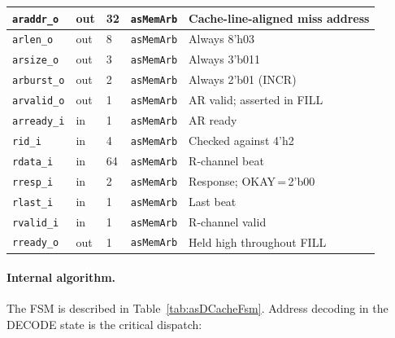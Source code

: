 \begin{table}[H]
\begin{tabularx}{\textwidth}{|l |l |l |l |X|}
  \hline
  \texttt{araddr\_o}  & out & 32 & \texttt{asMemArb} & Cache-line-aligned miss address \\
  \hline
  \texttt{arlen\_o}   & out & 8  & \texttt{asMemArb} & Always 8'h03 \\
  \hline
  \texttt{arsize\_o}  & out & 3  & \texttt{asMemArb} & Always 3'b011 \\
  \hline
  \texttt{arburst\_o} & out & 2  & \texttt{asMemArb} & Always 2'b01 (INCR) \\
  \hline
  \texttt{arvalid\_o} & out & 1  & \texttt{asMemArb} & AR valid; asserted in FILL \\
  \hline
  \texttt{arready\_i} & in  & 1  & \texttt{asMemArb} & AR ready \\
  \hline
  \texttt{rid\_i}     & in  & 4  & \texttt{asMemArb} & Checked against 4'h2 \\
  \hline
  \texttt{rdata\_i}   & in  & 64 & \texttt{asMemArb} & R-channel beat \\
  \hline
  \texttt{rresp\_i}   & in  & 2  & \texttt{asMemArb} & Response; OKAY\,=\,2'b00 \\
  \hline
  \texttt{rlast\_i}   & in  & 1  & \texttt{asMemArb} & Last beat \\
  \hline
  \texttt{rvalid\_i}  & in  & 1  & \texttt{asMemArb} & R-channel valid \\
  \hline
  \texttt{rready\_o}  & out & 1  & \texttt{asMemArb} & Held high throughout FILL \\
  \hline
\end{tabularx}
\end{table}

\paragraph{Internal algorithm.}
The FSM is described in Table~\ref{tab:asDCacheFsm}.
Address decoding in the DECODE state is the critical dispatch:

